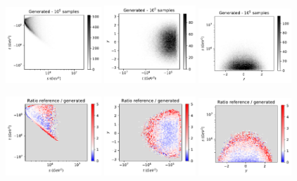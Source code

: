 \documentclass[twocolumn,preprintnumbers,superscriptaddress]{revtex4-2}
\begin{document}
\begin{figure}

  \includegraphics[width=0.32\textwidth]{plots/hardware/ibm_santiago/s-t_FAKE_IBM_100k.pdf}%
  \includegraphics[width=0.305\textwidth]{plots/hardware/ibm_santiago/t-y_FAKE_IBM_100k.pdf}%
  \includegraphics[width=0.31\textwidth]{plots/hardware/ibm_santiago/y-s_FAKE_IBM_100k.pdf}

  \includegraphics[width=0.32\textwidth]{plots/hardware/ibm_santiago/s-t_RATIO_IBM_100k.pdf}%
  \includegraphics[width=0.305\textwidth]{plots/hardware/ibm_santiago/t-y_RATIO_IBM_100k.pdf}%
  \includegraphics[width=0.31\textwidth]{plots/hardware/ibm_santiago/y-s_RATIO_IBM_100k.pdf}


\end{figure}
\end{document}

